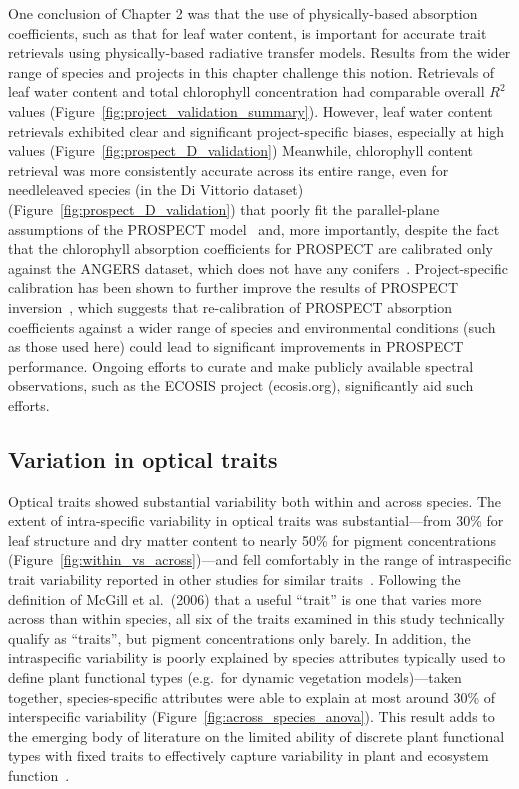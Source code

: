 One conclusion of Chapter 2 was that the use of physically-based absorption coefficients, such as that for leaf water content, is important for accurate trait retrievals using physically-based radiative transfer models.
Results from the wider range of species and projects in this chapter challenge this notion.
Retrievals of leaf water content and total chlorophyll concentration had comparable overall $R^2$ values (Figure~\ref{fig:project_validation_summary}).
However, leaf water content retrievals exhibited clear and significant project-specific biases, especially at high values (Figure~\ref{fig:prospect_D_validation})
Meanwhile, chlorophyll content retrieval was more consistently accurate across its entire range, even for needleleaved species (in the Di Vittorio dataset) (Figure~\ref{fig:prospect_D_validation}) that poorly fit the parallel-plane assumptions of the PROSPECT model~\cite{allen_1969_interaction,jacquemoud_1990_prospect} and, more importantly, despite the fact that the chlorophyll absorption coefficients for PROSPECT are calibrated only against the ANGERS dataset, which does not have any conifers~\cite{feret_2008_prospect,feret_2017_prospectd}.
Project-specific calibration has been shown to further improve the results of PROSPECT inversion~\cite{li_2013_retrieval}, which suggests that re-calibration of PROSPECT absorption coefficients against a wider range of species and environmental conditions (such as those used here) could lead to significant improvements in PROSPECT performance.
Ongoing efforts to curate and make publicly available spectral observations, such as the ECOSIS project (ecosis.org), significantly aid such efforts.

\subsection{Variation in optical traits}

Optical traits showed substantial variability both within and across species.
The extent of intra-specific variability in optical traits was substantial---from 30\% for leaf structure and dry matter content to nearly 50\% for pigment concentrations (Figure~\ref{fig:within_vs_across})---and fell comfortably in the range of intraspecific trait variability reported in other studies for similar traits~\cite{messier_how_2010,albert_multi-trait_2010}.
Following the definition of McGill et al.~(2006) that a useful ``trait'' is one that varies more across than within species, all six of the traits examined in this study technically qualify as ``traits'', but pigment concentrations only barely. \nocite{mcgill_2006_rebuilding}
In addition, the intraspecific variability is poorly explained by species attributes typically used to define plant functional types (e.g.\ for dynamic vegetation models)---taken together, species-specific attributes were able to explain at most around 30\% of interspecific variability (Figure~\ref{fig:across_species_anova}).
This result adds to the emerging body of literature on the limited ability of discrete plant functional types with fixed traits to effectively capture variability in plant and ecosystem function~\cite{vanbodegom2012_beyond,vanbodegom2014_fully,verheijen2015_variation,Clark_2016_Why}.

